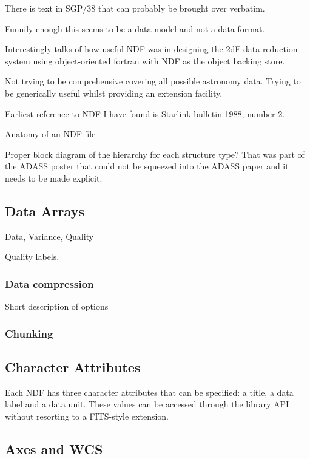 \documentclass[final,authoryear,5p,times,twocolumn]{elsarticle}
\begin{document}
{{\color{red}
There is text in SGP/38 that can probably be brought over verbatim.

Funnily enough this seems to be a data model and not a data format.

Interestingly \citet{1993ASPC...52..199B} talks of how useful NDF was in designing the
2dF data reduction system using object-oriented fortran with NDF as
the object backing store.

Not trying to be comprehensive covering all possible astronomy
data. Trying to be generically useful whilst providing an extension facility.

Earliest reference to NDF I have found is Starlink bulletin 1988,
number 2. \citep{1988STARB...2...11C}

Anatomy of an NDF file

Proper block diagram of the hierarchy for each structure type? That
was part of the ADASS poster that could not be squeezed into the ADASS
paper and it needs to be made explicit.
}

\subsection{Data Arrays}

{\color{red}
Data, Variance, Quality

Quality labels.
}
\subsubsection{Data compression}

{\color{red} Short description of options \citep{2008ASPC..394..650C}}

\subsubsection{Chunking}



\subsection{Character Attributes}

Each NDF has three character attributes that can be specified: a
title, a data label and a data unit. These values can be accessed
through the library API without resorting to a FITS-style extension.

\subsection{Axes and WCS}

}
\end{document}
